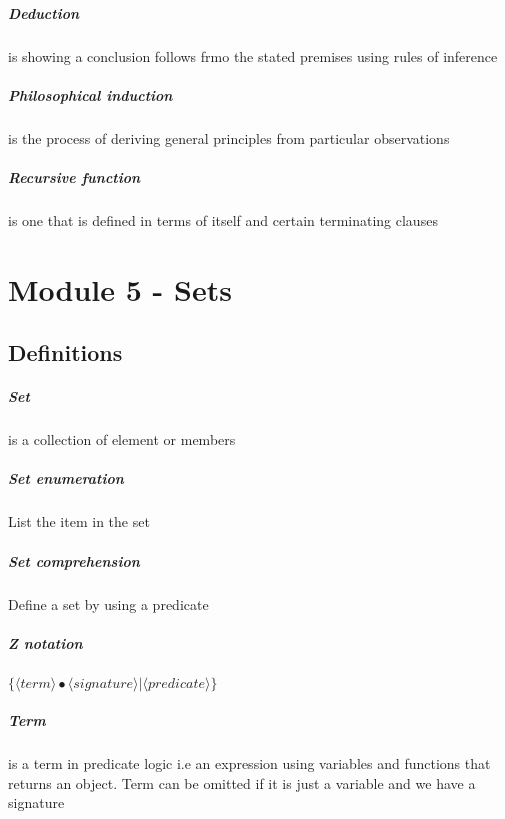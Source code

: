 \documentclass[12pt]{report}
\begin{document}
    \paragraph{Deduction} is showing a conclusion follows frmo the stated
    premises using rules of inference

    \paragraph{Philosophical induction} is the process of deriving general
    principles from particular observations

    \paragraph{Recursive function} is one that is defined in terms of itself
    and certain terminating clauses

\chapter{Module 5 - Sets}
  \section{Definitions}
    \paragraph{Set} is a collection of element or members

    \paragraph{Set enumeration} List the item in the set

    \paragraph{Set comprehension} Define a set by using a predicate

    \paragraph{Z notation} $ \{ \langle term \rangle \bullet \langle signature
    \rangle | \langle predicate \rangle \} $

    \paragraph{Term} is a term in predicate logic i.e an expression using
    variables and functions that returns an object. Term can be omitted if it
    is just a variable and we have a signature
\end{document}
